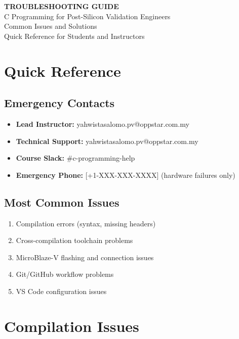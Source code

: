 \documentclass[11pt,a4paper]{article}
\begin{document}
\begin{center}
    {\Huge\bfseries\color{codeblue} TROUBLESHOOTING GUIDE}\\[0.5cm]
    {\Large C Programming for Post-Silicon Validation Engineers}\\[0.3cm]
    {\large Common Issues and Solutions}\\[0.2cm]
    {\normalsize Quick Reference for Students and Instructors}
\end{center}

\vspace{1cm}

\section{Quick Reference}

\subsection{Emergency Contacts}
\begin{itemize}
    \item \textbf{Lead Instructor:} yahwistasalomo.pv@oppstar.com.my
    \item \textbf{Technical Support:} yahwistasalomo.pv@oppstar.com.my
    \item \textbf{Course Slack:} \#c-programming-help
    \item \textbf{Emergency Phone:} [+1-XXX-XXX-XXXX] (hardware failures only)
\end{itemize}

\subsection{Most Common Issues}
\begin{enumerate}
    \item Compilation errors (syntax, missing headers)
    \item Cross-compilation toolchain problems
    \item MicroBlaze-V flashing and connection issues
    \item Git/GitHub workflow problems
    \item VS Code configuration issues
\end{enumerate}

\section{Compilation Issues}
\end{document}
